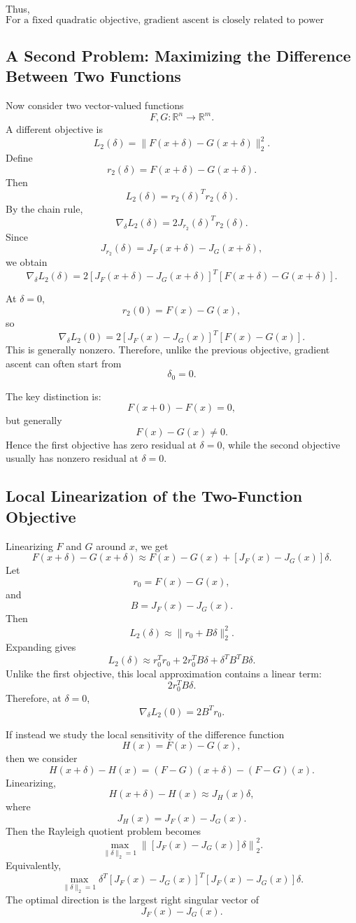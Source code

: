 \documentclass{article}
\begin{document}
Thus,
\[
\boxed{
\text{For a fixed quadratic objective, gradient ascent is closely related to power iteration.}
}
\]

\subsection{A Second Problem: Maximizing the Difference Between Two Functions}

Now consider two vector-valued functions
\[
F,G:\mathbb{R}^n\to \mathbb{R}^m.
\]
A different objective is
\[
L_2(\delta)
=
\|F(x+\delta)-G(x+\delta)\|_2^2.
\]
Define
\[
r_2(\delta)=F(x+\delta)-G(x+\delta).
\]
Then
\[
L_2(\delta)=r_2(\delta)^T r_2(\delta).
\]
By the chain rule,
\[
\nabla_\delta L_2(\delta)
=
2J_{r_2}(\delta)^T r_2(\delta).
\]
Since
\[
J_{r_2}(\delta)
=
J_F(x+\delta)-J_G(x+\delta),
\]
we obtain
\[
\boxed{
\nabla_\delta L_2(\delta)
=
2
\left[
J_F(x+\delta)-J_G(x+\delta)
\right]^T
\left[
F(x+\delta)-G(x+\delta)
\right].
}
\]

At \(\delta=0\),
\[
r_2(0)=F(x)-G(x),
\]
so
\[
\nabla_\delta L_2(0)
=
2
\left[
J_F(x)-J_G(x)
\right]^T
\left[
F(x)-G(x)
\right].
\]
This is generally nonzero. Therefore, unlike the previous objective, gradient ascent can often start from
\[
\delta_0=0.
\]

The key distinction is:
\[
F(x+0)-F(x)=0,
\]
but generally
\[
F(x)-G(x)\neq 0.
\]
Hence the first objective has zero residual at \(\delta=0\), while the second objective usually has nonzero residual at \(\delta=0\).

\subsection{Local Linearization of the Two-Function Objective}

Linearizing \(F\) and \(G\) around \(x\), we get
\[
F(x+\delta)-G(x+\delta)
\approx
F(x)-G(x)
+
\left[
J_F(x)-J_G(x)
\right]\delta.
\]
Let
\[
r_0=F(x)-G(x),
\]
and
\[
B=J_F(x)-J_G(x).
\]
Then
\[
L_2(\delta)
\approx
\|r_0+B\delta\|_2^2.
\]
Expanding gives
\[
L_2(\delta)
\approx
r_0^Tr_0
+
2r_0^TB\delta
+
\delta^TB^TB\delta.
\]
Unlike the first objective, this local approximation contains a linear term:
\[
2r_0^TB\delta.
\]
Therefore, at \(\delta=0\),
\[
\nabla_\delta L_2(0)
=
2B^Tr_0.
\]

If instead we study the local sensitivity of the difference function
\[
H(x)=F(x)-G(x),
\]
then we consider
\[
H(x+\delta)-H(x)
=
(F-G)(x+\delta)-(F-G)(x).
\]
Linearizing,
\[
H(x+\delta)-H(x)
\approx
J_H(x)\delta,
\]
where
\[
J_H(x)=J_F(x)-J_G(x).
\]
Then the Rayleigh quotient problem becomes
\[
\max_{\|\delta\|_2=1}
\left\|
\left[
J_F(x)-J_G(x)
\right]\delta
\right\|_2^2.
\]
Equivalently,
\[
\max_{\|\delta\|_2=1}
\delta^T
\left[
J_F(x)-J_G(x)
\right]^T
\left[
J_F(x)-J_G(x)
\right]
\delta.
\]
The optimal direction is the largest right singular vector of
\[
J_F(x)-J_G(x).
\]
\end{document}

